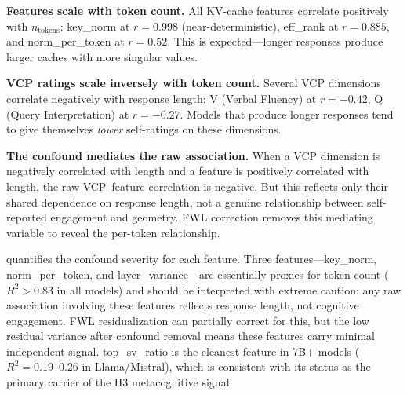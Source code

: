 \documentclass[11pt,a4paper]{article}
\begin{document}
\textbf{Features scale with token count.} All KV-cache features correlate positively with $n_{\text{tokens}}$: key\_norm at $r = 0.998$ (near-deterministic), eff\_rank at $r = 0.885$, and norm\_per\_token at $r = 0.52$. This is expected---longer responses produce larger caches with more singular values.

\textbf{VCP ratings scale inversely with token count.} Several VCP dimensions correlate negatively with response length: V (Verbal Fluency) at $r = -0.42$, Q (Query Interpretation) at $r = -0.27$. Models that produce longer responses tend to give themselves \emph{lower} self-ratings on these dimensions.

\textbf{The confound mediates the raw association.} When a VCP dimension is negatively correlated with length and a feature is positively correlated with length, the raw VCP--feature correlation is negative. But this reflects only their shared dependence on response length, not a genuine relationship between self-reported engagement and geometry. FWL correction removes this mediating variable to reveal the per-token relationship.

 quantifies the confound severity for each feature. Three features---key\_norm, norm\_per\_token, and layer\_variance---are essentially proxies for token count ($R^2 > 0.83$ in all models) and should be interpreted with extreme caution: any raw association involving these features reflects response length, not cognitive engagement. FWL residualization can partially correct for this, but the low residual variance after confound removal means these features carry minimal independent signal. top\_sv\_ratio is the cleanest feature in 7B+ models ($R^2 = 0.19$--$0.26$ in Llama/Mistral), which is consistent with its status as the primary carrier of the H3 metacognitive signal.
\end{document}
